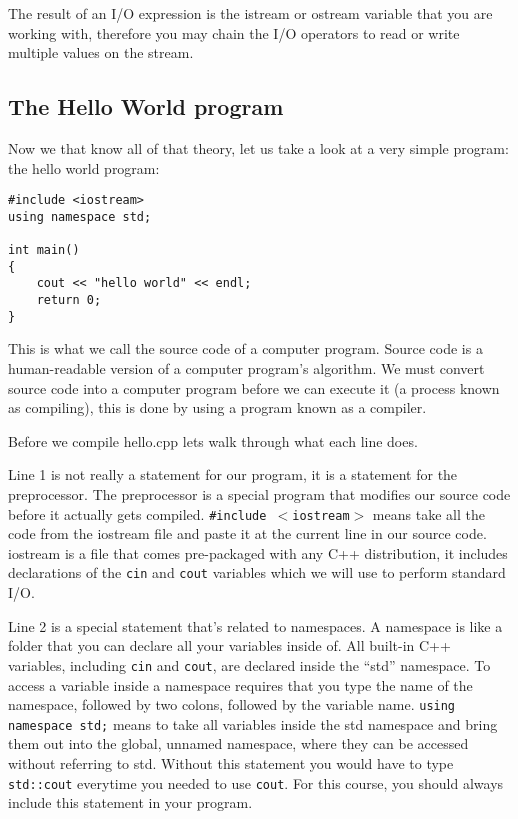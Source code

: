 \documentclass[a4paper,12pt]{article}
\begin{document}
The result of an I/O expression is the istream or ostream variable that you are working with, therefore you may chain the I/O operators to read or write multiple values on the stream.

\subsection*{The Hello World program}

Now we that know all of that theory, let us take a look at a very simple program: the hello world program:

\begin{lstlisting}[caption=hello.cpp]
#include <iostream>
using namespace std;

int main()
{
	cout << "hello world" << endl;
	return 0;
}
\end{lstlisting}

This is what we call the source code of a computer program. Source code is a human-readable version of a computer program's algorithm. We must convert source code into a computer program before we can execute it (a process known as compiling), this is done by using a program known as a compiler. 

Before we compile hello.cpp lets walk through what each line does.

Line 1 is not really a statement for our program, it is a statement for the preprocessor. The preprocessor is a special program that modifies our source code before it actually gets compiled. \texttt{\#include $<$iostream$>$} means take all the code from the iostream file and paste it at the current line in our source code. iostream is a file that comes pre-packaged with any C++ distribution, it includes declarations of the \texttt{cin} and \texttt{cout} variables which we will use to perform standard I/O. 

Line 2 is a special statement that's related to namespaces. A namespace is like a folder that you can declare all your variables inside of. All built-in C++ variables, including \texttt{cin} and \texttt{cout}, are declared inside the ``std'' namespace. To access a variable inside a namespace requires that you type the name of the namespace, followed by two colons, followed by the variable name. \texttt{using namespace std;} means to take all variables inside the std namespace and bring them out into the global, unnamed namespace, where they can be accessed without referring to std. Without this statement you would have to type \texttt{std::cout} everytime you needed to use \texttt{cout}. For this course, you should always include this statement in your program.
\end{document}

